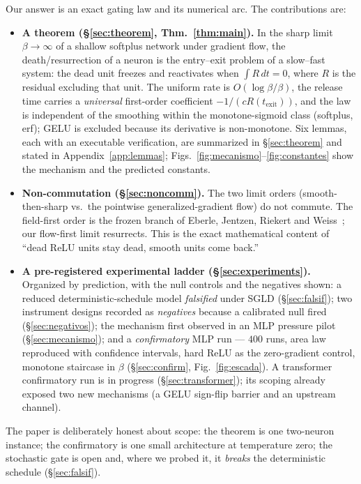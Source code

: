 \documentclass[11pt]{article}
\newcommand{\texit}{t_{\mathrm{exit}}}
\begin{document}
Our answer is an exact gating law and its numerical arc. The contributions are:

\begin{itemize}
\item \textbf{A theorem (\S\ref{sec:theorem}, Thm.~\ref{thm:main}).} In the sharp
limit $\beta\to\infty$ of a shallow softplus network under gradient flow, the
death/resurrection of a neuron is the entry--exit problem of a slow--fast system:
the dead unit freezes and reactivates when $\int R\,dt=0$, where $R$ is the
residual excluding that unit. The uniform rate is $O(\log\beta/\beta)$, the
release time carries a \emph{universal} first-order coefficient
$-1/(cR(\texit))$, and the law is independent of the smoothing within the
monotone-sigmoid class (softplus, erf); GELU is excluded because its derivative
is non-monotone. Six lemmas, each with an executable verification, are
summarized in \S\ref{sec:theorem} and stated in Appendix~\ref{app:lemmas};
Figs.~\ref{fig:mecanismo}--\ref{fig:constantes} show the mechanism and the
predicted constants.

\item \textbf{Non-commutation (\S\ref{sec:noncomm}).} The two limit orders
(smooth-then-sharp vs.\ the pointwise generalized-gradient flow) do not commute.
The field-first order is the frozen branch of Eberle, Jentzen, Riekert and
Weiss~\cite{EJRW23}; our flow-first limit resurrects. This is the exact
mathematical content of ``dead ReLU units stay dead, smooth units come back.''

\item \textbf{A pre-registered experimental ladder (\S\ref{sec:experiments}).}
Organized by prediction, with the null controls and the negatives shown:
a reduced deterministic-schedule model \emph{falsified} under SGLD
(\S\ref{sec:falsif}); two instrument designs recorded as \emph{negatives} because
a calibrated null fired (\S\ref{sec:negativos}); the mechanism first observed in
an MLP pressure pilot (\S\ref{sec:mecanismo}); and a \emph{confirmatory} MLP run
--- $400$ runs, area law reproduced with confidence intervals, hard ReLU as the
zero-gradient control, monotone staircase in $\beta$ (\S\ref{sec:confirm},
Fig.~\ref{fig:escada}). A transformer confirmatory run is in progress
(\S\ref{sec:transformer}); its scoping already exposed two new mechanisms (a
GELU sign-flip barrier and an upstream channel).
\end{itemize}

The paper is deliberately honest about scope: the theorem is one two-neuron
instance; the confirmatory is one small architecture at temperature zero; the
stochastic gate is open and, where we probed it, it \emph{breaks} the
deterministic schedule (\S\ref{sec:falsif}).
\end{document}
